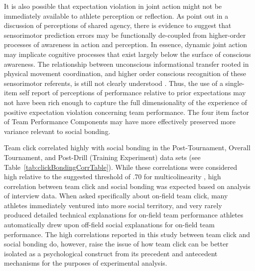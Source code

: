 It is also possible that expectation violation in joint action might not be immediately available to athlete perception or reflection.  As \textcite[1277]{VanderWel2012} point out in a discussion of perceptions of shared agency, there is evidence to suggest that sensorimotor prediction errors may be functionally de-coupled from higher-order processes of awareness in action and perception.  In essence, dynamic joint action may implicate cognitive processes that exist largely below the surface of conscious awareness. The relationship between unconscious informational transfer rooted in physical movement coordination, and higher order conscious recognition of these sensorimotor referents, is still not clearly understood \citep{Semin2008,Frith2007,Frith2010,Clark2013}.  Thus, the use of a single-item self report of perceptions of performance relative to prior expectations may not have been rich enough to capture the full dimensionality of the experience of positive expectation violation concerning team performance.  The four item factor of Team Performance Components may have more effectively preserved more variance relevant to social bonding.

 Team click correlated highly with social bonding in the Post-Tournament, Overall Tournament, and Post-Drill (Training Experiment) data sets (see Table~\ref{tab:clickBondingCorrTable}).  While these correlations were considered high relative to the suggested threshold of .70 for multicolinearity \citep{Field2012}, high correlation between team click and social bonding was expected based on analysis of interview data.  When asked specifically about on-field team click, many athletes immediately ventured into more social territory, and very rarely produced detailed technical explanations for   on-field team performance  athletes automatically drew upon off-field social explanations for on-field team performance.  The high correlations reported in this study between team click and social bonding do, however, raise the issue of how team click can be better isolated as a psychological construct from its precedent and antecedent mechanisms for the purposes of experimental analysis.



